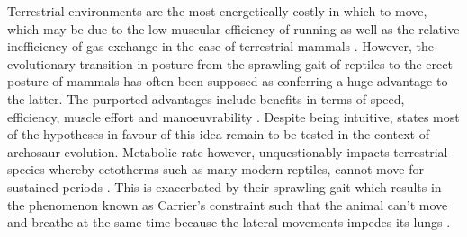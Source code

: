 \documentclass[a4paper,12pt]{article}
\begin{document}
Terrestrial environments are the most energetically costly in which to move, which may be due to the low muscular efficiency of running \citep{tucker1975energetic} as well as the relative inefficiency of gas exchange in the case of terrestrial mammals \citep[cf. birds and fish ][]{williams1999evolution}. %
%
%
However, the evolutionary transition in posture from the sprawling gait of reptiles to the erect posture of mammals has often been supposed as conferring a huge advantage to the latter.
The purported advantages include benefits in terms of speed, efficiency, muscle effort and manoeuvrability \citep{sullivan2015posture}. 
Despite being intuitive, \cite{sullivan2015posture} states most of the hypotheses in favour of this idea remain to be tested in the context of archosaur evolution. 
Metabolic rate however, unquestionably impacts terrestrial species whereby ectotherms such as many modern reptiles, cannot move for sustained periods \citep{bennett1979endothermy}. 
This is exacerbated by their sprawling gait which results in the phenomenon known as Carrier's constraint such that the animal can't move and breathe at the same time because the lateral movements impedes its lungs \citep{carrier1987evolution}. 
\end{document}

